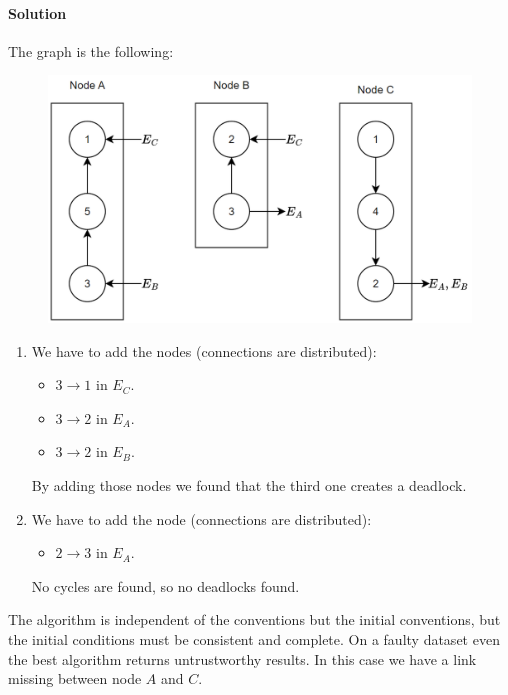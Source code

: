 \paragraph*{Solution}
The graph is the following: 
\begin{figure}[H]
    \centering
    \includegraphics[width=0.6\linewidth]{images/Ob4.png}
\end{figure}
\begin{enumerate}
    \item We have to add the nodes (connections are distributed): 
        \begin{itemize}
            \item $3 \rightarrow 1$ in $E_C$. 
            \item $3 \rightarrow 2$ in $E_A$. 
            \item $3 \rightarrow 2$ in $E_B$. 
        \end{itemize}
        By adding those nodes we found that the third one creates a deadlock. 
    \item We have to add the node (connections are distributed): 
        \begin{itemize}
            \item $2 \rightarrow 3$ in $E_A$. 
        \end{itemize}
        No cycles are found, so no deadlocks found. 
\end{enumerate}
The algorithm is independent of the conventions but the initial conventions, but the initial conditions must be consistent and complete. 
On a faulty dataset even the best algorithm returns untrustworthy results. 
In this case we have a link missing between node $A$ and $C$.